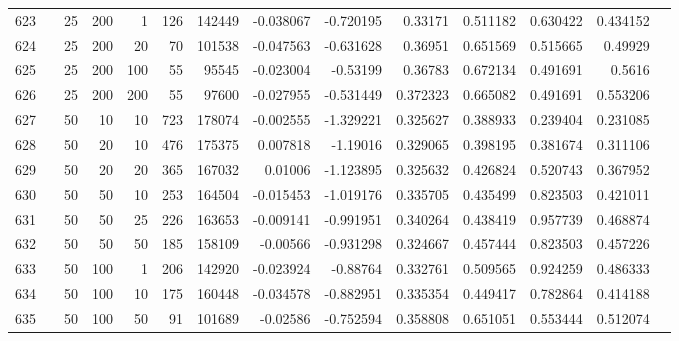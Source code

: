 \begin{longtable}{llrrrrrrrrrrrr}
		623 & &           25 &               200 &            1 &         126 &     142449 & -0.038067 & -0.720195 &   0.33171 &    0.511182 &       0.630422 &  0.434152 \\
		624 & &           25 &               200 &           20 &          70 &     101538 & -0.047563 & -0.631628 &   0.36951 &    0.651569 &       0.515665 &   0.49929 \\
		625 & &           25 &               200 &          100 &          55 &      95545 & -0.023004 &  -0.53199 &   0.36783 &    0.672134 &       0.491691 &    0.5616 \\
		626 & &           25 &               200 &          200 &          55 &      97600 & -0.027955 & -0.531449 &  0.372323 &    0.665082 &       0.491691 &  0.553206 \\
		627 & &           50 &                10 &           10 &         723 &     178074 & -0.002555 & -1.329221 &  0.325627 &    0.388933 &       0.239404 &  0.231085 \\
		628 & &           50 &                20 &           10 &         476 &     175375 &  0.007818 &  -1.19016 &  0.329065 &    0.398195 &       0.381674 &  0.311106 \\
		629 & &           50 &                20 &           20 &         365 &     167032 &   0.01006 & -1.123895 &  0.325632 &    0.426824 &       0.520743 &  0.367952 \\
		630 & &           50 &                50 &           10 &         253 &     164504 & -0.015453 & -1.019176 &  0.335705 &    0.435499 &       0.823503 &  0.421011 \\
		631 & \multirow[b]{9}{*}{\rotatebox[origin=l]{90}{use-lexrank-weighted}} &           50 &                50 &           25 &         226 &     163653 & -0.009141 & -0.991951 &  0.340264 &    0.438419 &       0.957739 &  0.468874 \\
		632 & &           50 &                50 &           50 &         185 &     158109 &  -0.00566 & -0.931298 &  0.324667 &    0.457444 &       0.823503 &  0.457226 \\
		633 & &           50 &               100 &            1 &         206 &     142920 & -0.023924 &  -0.88764 &  0.332761 &    0.509565 &       0.924259 &  0.486333 \\
		634 & &           50 &               100 &           10 &         175 &     160448 & -0.034578 & -0.882951 &  0.335354 &    0.449417 &       0.782864 &  0.414188 \\
		635 & &           50 &               100 &           50 &          91 &     101689 &  -0.02586 & -0.752594 &  0.358808 &    0.651051 &       0.553444 &  0.512074 \\

\end{longtable}
